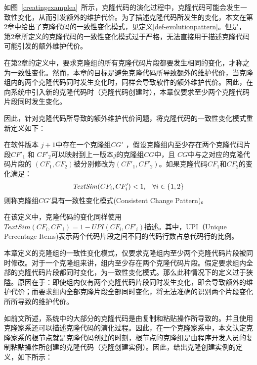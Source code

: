 如图~\ref{creatingexamplea}~所示，克隆代码的演化过程中，克隆代码可能会发生一致性变化，从而引发额外的维护代价。为了描述克隆代码所发生的变化，本文在第2章中给出了克隆代码的一致性变化模式，见定义\ref{def-evolutionpattern}。但是，
第2章所定义的克隆代码的一致性变化模式过于严格，无法直接用于描述克隆代码可能引发的额外维护代价。

在第2章的定义中，要求克隆组的所有克隆代码片段都要发生相同的变化，才称之为一致性变化。然而，本章的目标是避免克隆代码所导致额外的维护代价，当克隆组内的两个克隆代码同时发生变化时，同样会导致软件的额外维护代价。因此，在向系统中引入新的克隆代码时（克隆代码创建时），本章仅要求至少两个克隆代码片段同时发生变化。

因此，针对克隆代码所导致的额外维护代价问题，将克隆代码的一致性变化模式重新定义如下：

\begin{definition}[克隆创建时一致性变化模式] 
\label{def-creatingpattern}
在软件版本 $j+1$中存在一个克隆组$CG'$ ，假设克隆组内至少存在两个克隆代码片段$CF'_1$ 和 $CF'_2$可以映射到上一版本$j$的克隆组$CG$中，且 $CG$中与之对应的克隆代码片段的 $(CF_1,CF_2)$被分别修改为$(CF'_1,CF'_2)$。如果克隆代码$CF_1$和$CF_2$的变化满足：
\begin{equation}
  \begin{array}[t]{cl}
    \mathit{TextSim}(CF_i, CF'_i) < 1, & \forall i \in \{1,2\}  \\
  \end{array}
\end{equation}
则称克隆组$CG'$具有一致性变化模式(Consistent Change Pattern)。
\end{definition}

在该定义中，克隆代码的变化同样使用$\mathit{TextSim}(CF_i, CF'_i)= 1 - \mathit{UPI}(CF_i, CF'_i)$描述。其中，UPI（Unique Percentage Items\cite{roy2008nicad})表示两个代码片段之间不同的代码行数占总代码行的比例。

本章定义的克隆组的一致性变化模式，仅要求克隆组内至少两个克隆代码片段被同时修改。对于一个克隆组来讲，组内至少存在两个克隆代码片段。假定要求组内全部的克隆代码片段都同时变化，为一致性变化模式。那么此种情况下的定义过于狭隘。原因在于：即使组内仅有两个克隆代码片段同时发生变化，即会导致额外的维护代价；而要求组内全部克隆片段全部同时变化，将无法准确的识别两个片段变化所所导致的维护代价。

如前文所述，系统中的大部分的克隆代码是由复制和粘贴操作所导致的。并且使用克隆家系还可以描述克隆代码的演化过程。因此，在一个克隆家系中，本文认定克隆家系的根节点就是克隆代码创建的时刻，根节点的克隆组是由程序开发人员的复制粘贴操作所创建的克隆代码（克隆创建实例）。因此，给出克隆创建实例的定义，如下所示：

